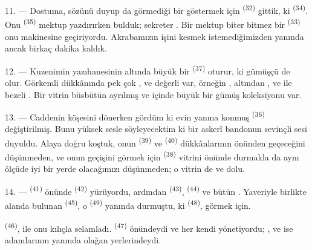 \VUsaut{3.0mm}

11. --- Dostuma, sözünü duyup da görmediği bir  göstermek
için  \textsuperscript{(32)} gittik, ki
 \textsuperscript{(34)}. Onu  \textsuperscript{(35)}
mektup yazdırırken bulduk; sekreter . Bir mektup biter
bitmez bir  \textsuperscript{(33)} onu makinesine geçiriyordu.
Akrabamızın işini kesmek istemediğimizden yanında ancak birkaç dakika kaldık.

12. --- Kuzenimin yazıhanesinin altında büyük bir 
\textsuperscript{(37)} oturur, ki gümüşçü de olur. Görkemli dükkânında pek çok
,  ve değerli
 var, örneğin , altından
,  ve  ile
 bezeli . Bir vitrin büsbütün
 ayrılmış ve içinde büyük bir gümüş
 koleksiyonu var.

13. --- Caddenin köşesini dönerken gördüm ki evin  yanına
konmuş  \textsuperscript{(36)} değiştirilmiş. Bunu yüksek
sesle söyleyecektim ki bir askerî bandonun sevinçli sesi duyuldu. Alaya doğru
koştuk, onun  \textsuperscript{(39)} ve
 \textsuperscript{(40)} dükkânlarının önünden geçeceğini
düşünmeden, ve onun geçişini görmek için 
\textsuperscript{(38)} vitrini önünde durmakla da aynı ölçüde iyi bir yerde
olacağımızı düşünmeden; o vitrin de  ve  dolu.

\VUsaut{3.0mm}

14. ---  \textsuperscript{(41)} önünde 
\textsuperscript{(42)} yürüyordu, ardından 
\textsuperscript{(43)},  \textsuperscript{(44)} ve bütün
. Yaveriyle birlikte alanda bulunan 
\textsuperscript{(45)}, o  \textsuperscript{(49)} yanında durmuştu, ki
 \textsuperscript{(48)},  görmek için.

 \textsuperscript{(46)},  ile
 onu kılıçla selamladı. 
 \textsuperscript{(47)} önündeydi ve her 
kendi  yönetiyordu; ,
 ve  ise adamlarının yanında olağan
yerlerindeydi.


